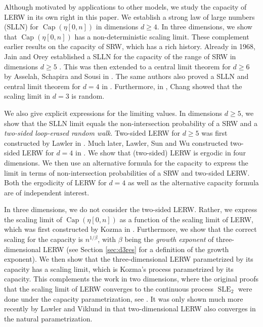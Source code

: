 \documentclass{article}
\DeclareMathOperator{\Ca}{Cap}
\DeclareMathOperator{\SLE}{SLE}
\newcommand{\1}{\mathbf{1}}
\theoremstyle{definition}
\numberwithin{equation}{section}
\numberwithin{theorem}{section}
\begin{document}
Although motivated by applications to other models, we study the capacity of LERW in its own right in this paper. We establish a strong law of large numbers (SLLN) for $\Ca(\eta[0,n])$ in dimensions $d\geq4$. In three dimensions, we show that $\Ca(\eta[0,n])$ has a non-deterministic scaling limit. These complement earlier results on the capacity of SRW, which has a rich history. Already in 1968, Jain and Orey established a SLLN for the capacity of the range of SRW in dimensions $d\geq5$ \cite{jain68range}. This was then extended to a central limit theorem for $d\geq6$ by Asselah, Schapira and Sousi in \cite{asselah18capacity}. The same authors also proved a SLLN and central limit theorem for $d=4$ in \cite{asselahcapacity19}. Furthermore, in \cite{chang17two}, Chang showed that the scaling limit in $d=3$ is random.

We also give explicit expressions for the limiting values. In dimensions $d\geq5$, we show that the SLLN limit equals the non-intersection probability of a SRW and a \emph{two-sided loop-erased random walk}. Two-sided LERW for $d\geq5$ was first constructed by Lawler in \cite{lawler80selfavoiding}. Much later, Lawler, Sun and Wu constructed two-sided LERW for $d=4$ in \cite{lawler19fourdimensional}. We show that (two-sided) LERW is ergodic in four dimensions. We then use an alternative formula for the capacity to express the limit in terms of non-intersection probabilities of a SRW and two-sided LERW. Both the ergodicity of LERW for $d=4$ as well as the alternative capacity formula are of independent interest.

In three dimensions, we do not consider the two-sided LERW. Rather, we express the scaling limit of $\Ca(\eta[0,n])$ as a function of the scaling limit of LERW, which was first constructed by Kozma in \cite{kozma2007scaling}. Furthermore, we show that the correct scaling for the capacity is $n^{1/\beta}$, with $\beta$ being the \emph{growth exponent} of three-dimensional LERW (see Section \ref{sec:d3res} for a definition of the growth exponent). We then show that the three-dimensional LERW parametrized by its capacity has a scaling limit, which is Kozma's process parametrized by its capacity. This complements the work in two dimensions, where the original proofs that the scaling limit of LERW converges to the continuous process $\SLE_2$ were done under the capacity parametrization, see \cite{lawler2011conformal}. It was only shown much more recently by Lawler and Viklund in \cite{lawler2021convergence} that two-dimensional LERW also converges in the natural parametrization.
\end{document}
